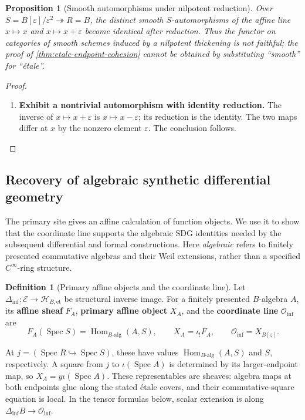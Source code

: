\documentclass[11pt,a4paper]{article}
\numberwithin{algorithm}{section}
\numberwithin{equation}{section}
\newtheorem{proposition}[proposition]{Proposition}
\theoremstyle{definition}
\newtheorem{definition}[definition]{Definition}
\theoremstyle{remark}
\theoremstyle{plain}
\newcommand{\E}{\mathcal E}
\newcommand{\eps}{\varepsilon}
\newcommand{\Hom}{\operatorname{Hom}}
\newcommand{\ThickEt}{\mathscr H_{B,\mathrm{et}}}
\theoremstyle{definition}
\theoremstyle{plain}
\begin{document}
\begin{proposition}[Smooth automorphisms under nilpotent reduction]
\label{prop:smooth-not-rigid}
Over $S=B[\eps]/\eps^2\twoheadrightarrow R=B$,
the distinct smooth $S$-automorphisms of the affine line
$x\mapsto x$ and $x\mapsto x+\eps$ become identical after
reduction.  Thus the functor on categories of smooth schemes
induced by a nilpotent thickening is not faithful; the
proof of \cref{thm:etale-endpoint-cohesion} cannot be
obtained by substituting ``smooth'' for ``\'etale''.
\end{proposition}
\begin{proof}\leavevmode
\begin{enumerate}[leftmargin=*,align=left]
\item \textbf{Exhibit a nontrivial automorphism with identity reduction.}
The inverse of $x\mapsto x+\eps$ is $x\mapsto x-\eps$;
its reduction is the identity.  The two maps differ at
$x$ by the nonzero element $\eps$.  The conclusion follows.
\end{enumerate}
\end{proof}

\subsection{Recovery of algebraic synthetic differential geometry}
\label{sec:primary-sdg}
The primary site gives an affine calculation of function objects.
We use it to show that the coordinate line supports the algebraic
SDG identities needed by the subsequent differential and formal
constructions. Here \emph{algebraic} refers to finitely presented
commutative algebras and their Weil extensions, rather than a specified
$C^\infty$-ring structure.


\begin{definition}[Primary affine objects and the coordinate line]\label{def:primary-affine-objects}
Let $\Delta_{\mathrm{inf}}:\E\to\ThickEt$ be structural inverse
image. For a finitely presented $B$-algebra $A$, its \textbf{affine
sheaf} $F_A$, \textbf{primary affine object} $X_A$, and the
\textbf{coordinate line} $\mathcal O_{\mathrm{inf}}$ are
\[
 F_A(\operatorname{Spec}S)=\Hom_{B\text{-alg}}(A,S),\qquad
 X_A=\iota_!F_A,\qquad
 \mathcal O_{\mathrm{inf}}=X_{B[z]}.
\]
\end{definition}


At $j=(\operatorname{Spec}R\hookrightarrow\operatorname{Spec}S)$,
these have values $\Hom_{B\text{-alg}}(A,S)$ and $S$, respectively.
A square from $j$ to $\iota(\operatorname{Spec}A)$ is determined by
its larger-endpoint map, so
$X_A=y\iota(\operatorname{Spec}A)$.  These representables are sheaves:
algebra maps at both endpoints glue along the stated \'etale covers,
and their commutative-square equation is local.  In the tensor formulas
below, scalar extension is along
$\Delta_{\mathrm{inf}}B\to\mathcal O_{\mathrm{inf}}$.
\end{document}
